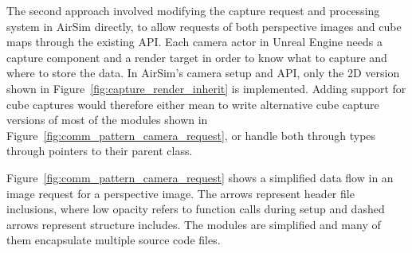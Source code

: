 The second approach involved modifying the capture request and processing system in AirSim directly, to allow requests of both perspective images and cube maps through the existing API. Each camera actor in Unreal Engine needs a capture component and a render target in order to know what to capture and where to store the data. In AirSim's camera setup and API, only the 2D version shown in Figure~\ref{fig:capture_render_inherit} is implemented. Adding support for cube captures would therefore either mean to write alternative cube capture versions of most of the modules shown in Figure~\ref{fig:comm_pattern_camera_request}, or handle both through types through pointers to their parent class.
 
Figure~\ref{fig:comm_pattern_camera_request} shows a simplified data flow in an image request for a perspective image. The arrows represent header file inclusions, where low opacity refers to function calls during setup and dashed arrows represent structure includes. The modules are simplified and many of them encapsulate multiple source code files.

